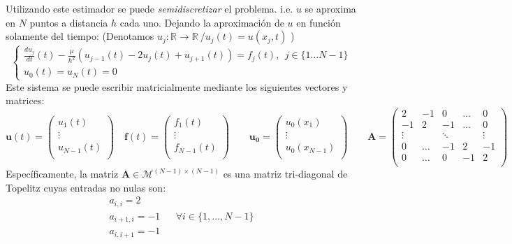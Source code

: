 \documentclass{endm}
\begin{document}
Utilizando este estimador se puede \textit{semidiscretizar} el problema. i.e. $u$ se aproxima en $N$ puntos a distancia $h$ cada uno. Dejando la aproximación de $u$ en función solamente del tiempo: (Denotamos $u_j: \mathbb{R} \rightarrow \mathbb{R} \ / u_j(t)=u(x_j,t)$ ) 
\begin{equation} \label{sistema_jj}
\begin{cases} 
   \frac{d u_j}{d t}(t) - \frac{\mu}{h^2}(u_{j-1}(t) -2u_j(t) + u_{j+1}(t)) = f_j(t),  \ \ j \in \{1 \dots N-1\}\\
   u_0(t) = u_N(t) = 0
\end{cases}
\end{equation}
Este sistema se puede escribir matricialmente mediante los siguientes vectores y matrices:
\begin{equation*}
    \boldsymbol{u}(t)=
        \begin{pmatrix}
            u_1(t)\\
            \vdots\\
            u_{N-1}(t)\\
    \end{pmatrix}
    \quad
    \boldsymbol{f}(t)=
        \begin{pmatrix}
            f_1(t)\\
            \vdots\\
            f_{N-1}(t)\\             
        \end{pmatrix}
    \qquad
    \boldsymbol{u_0}=
        \begin{pmatrix}
        u_{0}(x_{1})\\
        \vdots\\
        u_{0}(x_{N-1})\\             
        \end{pmatrix}
    \qquad
    \boldsymbol{A}= 
        \begin{pmatrix}
        2 & -1 & 0 & \dots & 0 \\
        -1 & 2 & -1 & \dots & 0 \\
        \vdots & &\ddots & & \vdots \\
        0 & \dots & -1 & 2 & -1 \\
        0 & \dots & 0 & -1 & 2 \\
        \end{pmatrix}
\end{equation*}
Específicamente, la matriz $\boldsymbol{A} \in \mathcal{M}^{(N-1)\times(N-1)}$ es una matriz tri-diagonal de Topelitz \cite{topelitz} cuyas entradas no nulas son: 
\begin{align} \label{Arules}
 a_{i,i} = 2 \\
 a_{i+1,i} = -1  &&   \forall i \in \bigg\{ 1, \dots, N - 1\bigg\} \\
 a_{i,i+1} = -1
\end{align}
\end{document}
